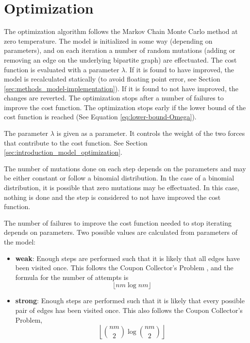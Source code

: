 \section{Optimization}
\label{sec:methods_optimization}

The optimization algorithm follows the Markov Chain Monte Carlo method at zero temperature.
The model is initialized in some way (depending on parameters), and on each iteration a number of random mutations (adding or removing an edge on the underlying bipartite graph) are effectuated.
The cost function is evaluated with a parameter $\lambda$.
If it is found to have improved, the model is recalculated statically (to avoid floating point error, see Section \ref{sec:methods_model-implementation}).
If it is found to not have improved, the changes are reverted.
The optimization stops after a number of failures to improve the cost function.
The optimization stops early if the lower bound of the cost function is reached (See Equation \eqref{eq:lower-bound-Omega}).

The parameter $\lambda$ is given as a parameter.
It controls the weight of the two forces that contribute to the cost function.
See Section \ref{sec:introduction_model_optimization}.

The number of mutations done on each step depends on the parameters and may be either constant or follow a binomial distribution.
In the case of a binomial distribution, it is possible that zero mutations may be effectuated.
In this case, nothing is done and the step is considered to not have improved the cost function.

The number of failures to improve the cost function needed to stop iterating depends on parameters.
Two possible values are calculated from parameters of the model:
\begin{itemize}
\item \textbf{weak}:
  Enough steps are performed such that it is likely that all edges have been visited once.
  This follows the Coupon Collector's Problem \cite{Mitzenmacher2017}, and the formula for the number of attempts is
  \begin{equation*}
    \lfloor nm \log nm \rfloor
  \end{equation*}
\item \textbf{strong}:
  Enough steps are performed such that it is likely that every possible pair of edges has been visited once.
  This also follows the Coupon Collector's Problem,
  \begin{equation*}
    \left\lfloor {nm \choose 2} \log {nm \choose 2} \right\rfloor
  \end{equation*}
\end{itemize}

